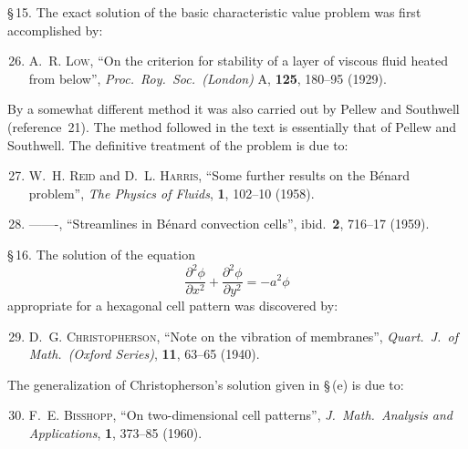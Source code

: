 \noindent \S\,15. The exact solution of the basic characteristic value problem was first
accomplished by:

\begin{enumerate}
\setcounter{enumi}{25}

\item A.~R. \textsc{Low}, ``On the criterion for stability of a layer of viscous fluid heated
  from below'', \textit{Proc.\ Roy.\ Soc.\ (London)} A, \textbf{125}, 180--95 (1929).

\end{enumerate}

\noindent By a somewhat different method it was also carried out by Pellew and Southwell
(reference~21). The method followed in the text is essentially that of Pellew
and Southwell. The definitive treatment of the problem is due to:

\begin{enumerate}
\setcounter{enumi}{26}

\item W.~H. \textsc{Reid} and D.~L. \textsc{Harris}, ``Some further results on the B\'enard
  problem'', \textit{The Physics of Fluids}, \textbf{1}, 102--10 (1958).

\item -------, ``Streamlines in B\'enard convection cells'', ibid.\ \textbf{2}, 716--17
  (1959).

\end{enumerate}

\noindent \S\,16. The solution of the equation
%
\[ \frac{\partial^2\phi}{\partial x^2} + \frac{\partial^2\phi}{\partial y^2} = -a^2\phi \]
%
appropriate for a hexagonal cell pattern was discovered by:

\begin{enumerate}
\setcounter{enumi}{28}

\item D.~G. \textsc{Christopherson}, ``Note on the vibration of membranes'',
  \textit{Quart.\ J.\ of Math.\ (Oxford Series)}, \textbf{11}, 63--65 (1940).

\end{enumerate}

\noindent The generalization of Christopherson's solution given in \S\,(e) is due to:

\begin{enumerate}
\setcounter{enumi}{29}

\item F.~E. \textsc{Bisshopp}, ``On two-dimensional cell patterns'',
  \textit{J.\ Math.\ Analysis and Applications}, \textbf{1}, 373--85 (1960).

\end{enumerate}

